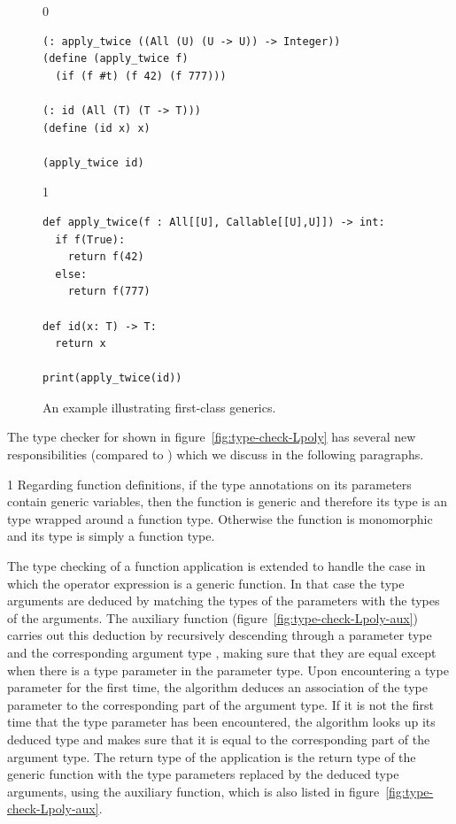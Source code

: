 \documentclass[7x10]{TimesAPriori_MIT}%
\def\racketEd{0}
\def\pythonEd{1}
\providecommand{\BookEdition}{1}
\let\edition\BookEdition
\newcommand{\pythonColor}[0]{}
\numberwithin{theorem}{chapter}
\numberwithin{definition}{chapter}
\numberwithin{equation}{chapter}
\begin{document}
\begin{figure}[tbp]
\begin{tcolorbox}[colback=white]  
{\if\edition\racketEd
\begin{lstlisting}
(: apply_twice ((All (U) (U -> U)) -> Integer))
(define (apply_twice f)
  (if (f #t) (f 42) (f 777)))

(: id (All (T) (T -> T)))
(define (id x) x)

(apply_twice id)
\end{lstlisting}
\fi}
{\if\edition\pythonEd\pythonColor
\begin{lstlisting}
def apply_twice(f : All[[U], Callable[[U],U]]) -> int:
  if f(True):
    return f(42)
  else:
    return f(777)

def id(x: T) -> T:
  return x

print(apply_twice(id))
\end{lstlisting}
\fi}
\end{tcolorbox}

\caption{An example illustrating first-class generics.}
\label{fig:apply-twice}
\end{figure}


The type checker for \LangPoly{} shown in
figure~\ref{fig:type-check-Lpoly} has several new responsibilities
(compared to \LangLam{}) which we discuss in the following paragraphs.

{\if\edition\pythonEd\pythonColor
%
Regarding function definitions, if the type annotations on its
parameters contain generic variables, then the function is generic and
therefore its type is an  type wrapped around a function
type. Otherwise the function is monomorphic and its type is simply
a function type.
%
\fi}

The type checking of a function application is extended to handle the
case in which the operator expression is a generic function. In that case
the type arguments are deduced by matching the types of the parameters
with the types of the arguments.
%
The  auxiliary function
(figure~\ref{fig:type-check-Lpoly-aux}) carries out this deduction by
recursively descending through a parameter type  and
the corresponding argument type , making sure that they
are equal except when there is a type parameter in the parameter
type. Upon encountering a type parameter for the first time, the
algorithm deduces an association of the type parameter to the
corresponding part of the argument type. If it is not the first time
that the type parameter has been encountered, the algorithm looks up
its deduced type and makes sure that it is equal to the corresponding
part of the argument type.  The return type of the application is the
return type of the generic function with the type parameters
replaced by the deduced type arguments, using the
 auxiliary function, which is also listed in
figure~\ref{fig:type-check-Lpoly-aux}.
\end{document}
